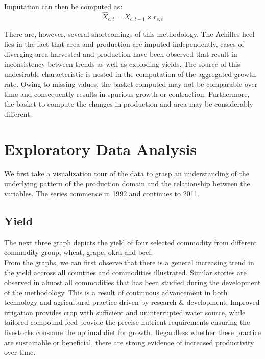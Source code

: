 \documentclass[nojss]{jss}\usepackage[]{graphicx}\usepackage[]{color}
\begin{document}
Imputation can then be computed as:
\begin{equation}
  \hat{X}_{c, t} = X_{c, t-1} \times r_{s, t}
\end{equation}
  

There are, however, several shortcomings of this methodology. The
Achilles heel lies in the fact that area and production are imputed
independently, cases of diverging area harvested and production have
been observed that result in inconsistency between trends as well as
exploding yields. The source of this undesirable characteristic is
nested in the computation of the aggregated growth rate. Owing to
missing values, the basket computed may not be comparable over time
and consequently results in spurious growth or
contraction. Furthermore, the basket to compute the changes in
production and area may be considerably different.\\


\section{Exploratory Data Analysis}

We first take a visualization tour of the data to grasp an
understanding of the underlying pattern of the production domain and
the relationship between the variables. The series commence in 1992
and continues to 2011.

\subsection{Yield}

The next three graph depicts the yield of four selected commodity from
different commodity group, wheat, grape, okra and beef.\\


From the graphs, we can first observe that there is a general
increasing trend in the yield accross all countries and commodities
illustrated. Similar stories are observed in almost all commodities
that has been studied during the development of the methodology. This
is a result of continuous advancement in both technology and
agricultural practice driven by research \& development. Improved
irrigation provides crop with sufficient and uninterrupted water
source, while tailored compound feed provide the precise nutrient
requirements ensuring the livestocks consume the optimal diet for
growth. Regardless whether these practice are sustainable or
beneficial, there are strong evidence of increased productivity over
time.\\
\end{document}
